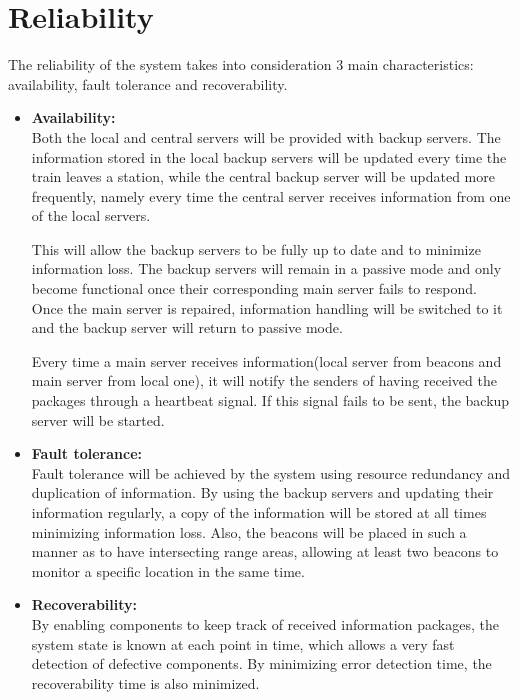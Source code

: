 \section{Reliability}
The reliability of the system takes into consideration 3 main characteristics: availability, fault tolerance and recoverability\cite{iso}.
\begin{itemize}
	\item \textbf{Availability:} \\
	Both the local and central servers will be provided with backup servers. The information stored in the local backup servers will be updated every time the train leaves a station, while the central backup server will be updated more frequently, namely every time the central server receives information from one of the local servers. 
	
	This will allow the backup servers to be fully up to date and to minimize information loss. The backup servers will remain in a passive mode and only become functional once their corresponding main server fails to respond. Once the main server is repaired, information handling will be switched to it and the backup server will return to passive mode.
	
	Every time a main server receives information(local server from beacons and main server from local one), it will notify the senders of having received the packages through a heartbeat signal. If this signal fails to be sent, the backup server will be started.
	
	\item \textbf{Fault tolerance:} \\
	Fault tolerance will be achieved by the system using resource redundancy and duplication of information. By using the backup servers and updating their information regularly, a copy of the information will be stored at all times minimizing information loss. Also, the beacons will be placed in such a manner as to have intersecting range areas, allowing at least two beacons to monitor a specific location in the same time.
	
	\item \textbf{Recoverability:} \\
	By enabling components to keep track of received information packages, the system state is known at each point in time, which allows a very fast detection of defective components. By minimizing error detection time, the recoverability time is also minimized.
\end{itemize}
